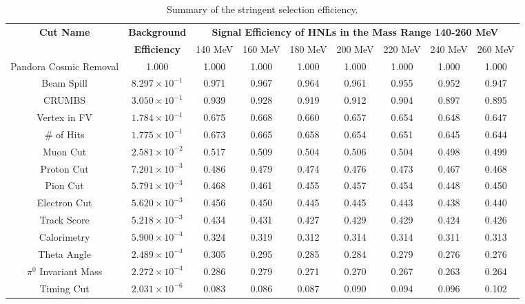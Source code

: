 \begin{landscape}
\begin{table}[htbp!]
\caption[Summary of the Stringent Selection Efficiency]{Summary of the stringent selection efficiency.}
\label{table:cut_eff_strict}
\centering
\begin{center}
\begin{tabular}{| c | c | c | c | c | c | c | c | c |} 
 \hline
 \textbf{Cut Name} & \textbf{Background} & \multicolumn{7}{c|}{\textbf{Signal Efficiency of HNLs in the Mass Range 140-260 MeV}}\\ [1ex]
 \cline{3-9} 
		   &  \textbf{Efficiency} & 140 MeV & 160 MeV  & 180 MeV  & 200 MeV  & 220 MeV  & 240 MeV  & 260 MeV  \\ [1ex] 
 \hline
 Pandora Cosmic Removal & 1.000  		 & 1.000 & 1.000 & 1.000 & 1.000 & 1.000 & 1.000 & 1.000 \\ [1ex] 
 Beam Spill 		& $8.297 \times 10^{-1}$ & 0.971 & 0.967 & 0.964 & 0.961 & 0.955 & 0.952 & 0.947 \\ [1ex] 
 CRUMBS 		& $3.050 \times 10^{-1}$ & 0.939 & 0.928 & 0.919 & 0.912 & 0.904 & 0.897 & 0.895 \\ [1ex] 
 Vertex in FV 		& $1.784 \times 10^{-1}$ & 0.675 & 0.668 & 0.660 & 0.657 & 0.654 & 0.648 & 0.647 \\ [1ex]
 \# of Hits 		& $1.775 \times 10^{-1}$ & 0.673 & 0.665 & 0.658 & 0.654 & 0.651 & 0.645 & 0.644 \\ [1ex]
 Muon Cut 		& $2.581 \times 10^{-2}$ & 0.517 & 0.509 & 0.504 & 0.506 & 0.504 & 0.498 & 0.499 \\ [1ex]
 Proton Cut 		& $7.201 \times 10^{-3}$ & 0.486 & 0.479 & 0.474 & 0.476 & 0.473 & 0.467 & 0.468 \\ [1ex]
 Pion Cut 		& $5.791 \times 10^{-3}$ & 0.468 & 0.461 & 0.455 & 0.457 & 0.454 & 0.448 & 0.450 \\ [1ex]
 Electron Cut 		& $5.620 \times 10^{-3}$ & 0.456 & 0.450 & 0.445 & 0.445 & 0.443 & 0.438 & 0.440 \\ [1ex]
 Track Score 		& $5.218 \times 10^{-3}$ & 0.434 & 0.431 & 0.427 & 0.429 & 0.429 & 0.424 & 0.426 \\ [1ex]
 Calorimetry 		& $5.900 \times 10^{-4}$ & 0.324 & 0.319 & 0.312 & 0.314 & 0.314 & 0.311 & 0.313 \\ [1ex]
 Theta Angle 		& $2.489 \times 10^{-4}$ & 0.305 & 0.295 & 0.285 & 0.284 & 0.279 & 0.276 & 0.276 \\ [1ex]
 $\pi^0$ Invariant Mass & $2.272 \times 10^{-4}$ & 0.286 & 0.279 & 0.271 & 0.270 & 0.267 & 0.263 & 0.264 \\ [1ex]
 Timing Cut  		& $2.031 \times 10^{-6}$ & 0.083 & 0.086 & 0.087 & 0.090 & 0.094 & 0.096 & 0.102 \\ [1ex]
 \hline
\end{tabular}
\end{center}
\end{table}
\end{landscape}

